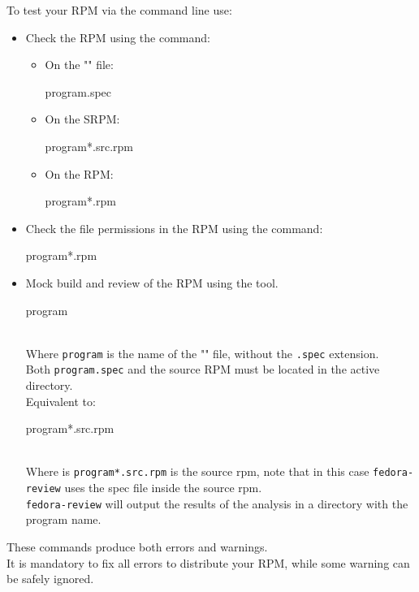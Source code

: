 To test your RPM via the command line use:
\begin{itemize}
\item Check the RPM using the  command:
\begin{itemize}
\item On the "" file:
\begin{scriptii}
\fprompt{~}   program.spec
\end{scriptii}
\item On the SRPM:
\begin{scriptii}
\fprompt{~}   program*.src.rpm 
\end{scriptii}
\item On the RPM:
\begin{scriptii}
\fprompt{~}   program*.rpm 
\end{scriptii}
\end{itemize}
\item Check the file permissions in the RPM using the  command:
\begin{scripti}
\fprompt{~}  program*.rpm
\end{scripti}
\item Mock build and review of the RPM using the  tool. 
\begin{scripti}
\fprompt{~}   program
\end{scripti}
\\[-1cm]
\noindent Where \texttt{program} is the name of the "" file, without the \texttt{.spec} extension. \\
Both \texttt{program.spec} and the source RPM must be located in the active directory. \\
\newpage
\noindent Equivalent to: 
\begin{scripti}
\fprompt{~}   program*.src.rpm
\end{scripti}
\\[-1cm]
\noindent Where is \texttt{program*.src.rpm} is the source rpm, note that in this case \texttt{fedora-review} uses the spec file inside the source rpm. \\[0.25cm]
\texttt{fedora-review} will output the results of the analysis in a directory with the program name. 
\end{itemize}
These commands produce both errors and warnings. \\
It is mandatory to fix all errors to distribute your RPM, while some warning can be safely ignored. 

